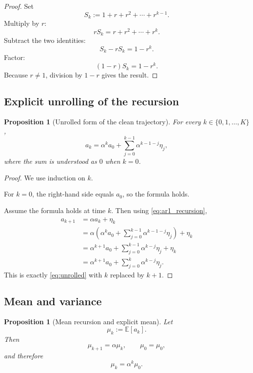 \documentclass[11pt]{article}
\numberwithin{equation}{section}
\newtheorem{proposition}[theorem]{Proposition}
\theoremstyle{definition}
\theoremstyle{remark}
\newcommand{\E}{\mathbb{E}}
\begin{document}
\begin{proof}
Set
\[
S_k:=1+r+r^2+\cdots+r^{k-1}.
\]
Multiply by $r$:
\[
rS_k = r+r^2+\cdots+r^k.
\]
Subtract the two identities:
\[
S_k-rS_k = 1-r^k.
\]
Factor:
\[
(1-r)S_k=1-r^k.
\]
Because $r\neq 1$, division by $1-r$ gives the result.
\end{proof}

\subsection{Explicit unrolling of the recursion}

\begin{proposition}[Unrolled form of the clean trajectory]\label{prop:unrolled}
For every $k\in\{0,1,\dots,K\}$,
\begin{equation}\label{eq:unrolled}
a_k=\alpha^k a_0+\sum_{j=0}^{k-1}\alpha^{k-1-j}\eta_j,
\end{equation}
where the sum is understood as $0$ when $k=0$.
\end{proposition}

\begin{proof}
We use induction on $k$.

For $k=0$, the right-hand side equals $a_0$, so the formula holds.

Assume the formula holds at time $k$. Then using \eqref{eq:ar1_recursion},
\begin{align*}
a_{k+1}
&=\alpha a_k+\eta_k \\
&=\alpha\left(\alpha^k a_0+\sum_{j=0}^{k-1}\alpha^{k-1-j}\eta_j\right)+\eta_k \\
&=\alpha^{k+1}a_0+\sum_{j=0}^{k-1}\alpha^{k-j}\eta_j+\eta_k \\
&=\alpha^{k+1}a_0+\sum_{j=0}^{k}\alpha^{k-j}\eta_j.
\end{align*}
This is exactly \eqref{eq:unrolled} with $k$ replaced by $k+1$.
\end{proof}

\subsection{Mean and variance}

\begin{proposition}[Mean recursion and explicit mean]\label{prop:mean}
Let
\[
\mu_k:=\E[a_k].
\]
Then
\[
\mu_{k+1}=\alpha\mu_k,\qquad \mu_0=\mu_0,
\]
and therefore
\begin{equation}\label{eq:mean_formula}
\mu_k=\alpha^k\mu_0.
\end{equation}
\end{proposition}
\end{document}

